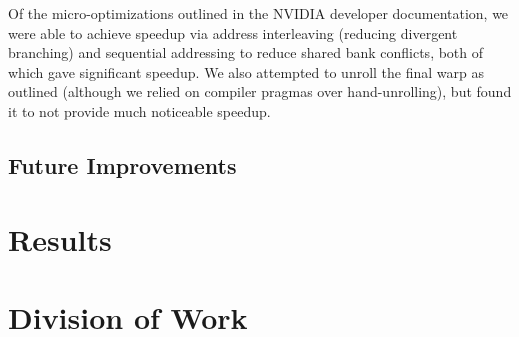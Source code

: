\documentclass[12pt]{article}
\begin{document}
Of the micro-optimizations outlined in the NVIDIA developer
documentation\cite{reduceopt}, we were able to achieve speedup via address
interleaving (reducing divergent branching) and sequential addressing to reduce
shared bank conflicts, both of which gave significant speedup. We also
attempted to unroll the final warp as outlined (although we relied on compiler
pragmas over hand-unrolling), but found it to not provide much noticeable
speedup.

\subsection{Future Improvements}

\section{Results}

\section{Division of Work}



\end{document}
